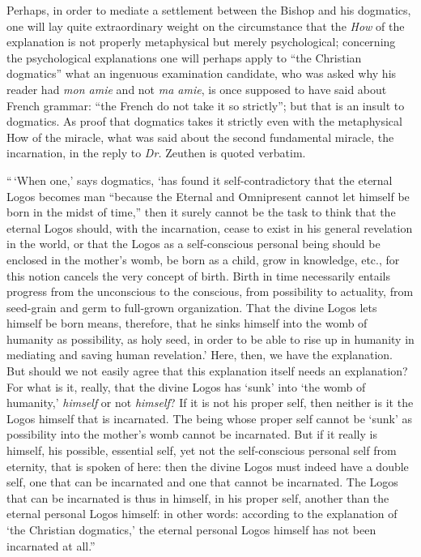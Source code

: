 \documentclass[12pt]{book}
\newcommand{\opage}[1]{\marginnote{\footnotesize\textit{[#1]}}}
\begin{document}
Perhaps, in order to mediate a settlement between the Bishop and his dogmatics, one will lay quite extraordinary weight on the circumstance that the \emph{How} of the explanation is not properly metaphysical but merely psychological; concerning the psychological explanations one will perhaps apply to ``the Christian dogmatics'' what an ingenuous examination candidate, who was asked why his reader had \textit{mon amie} and not \textit{ma amie}, is once supposed to have said about French grammar: ``the French do not take it so strictly''; but that is an insult to dogmatics. As proof that dogmatics takes it strictly even with the metaphysical How of the miracle, what was said about the second fundamental miracle, the incarnation, in the reply to \textit{Dr.} Zeuthen is quoted verbatim.

``\,`When one,' says dogmatics, `has found it self-contradictory that the eternal Logos becomes man ``because the Eternal and Omnipresent cannot let himself be born in the midst of time,'' then it surely cannot be the task to think that the eternal Logos should, with the incarnation, cease to exist in his general revelation in the world, or that the Logos as a self-conscious personal
\opage{88}\setcounter{footnote}{0}%
being should be enclosed in the mother's womb, be born as a child, grow in knowledge, etc., for this notion cancels the very concept of birth. Birth in time necessarily entails progress from the unconscious to the conscious, from possibility to actuality, from seed-grain and germ to full-grown organization. That the divine Logos lets himself be born means, therefore, that he sinks himself into the womb of humanity as possibility, as holy seed, in order to be able to rise up in humanity in mediating and saving human revelation.' Here, then, we have the explanation. But should we not easily agree that this explanation itself needs an explanation? For what is it, really, that the divine Logos has `sunk' into `the womb of humanity,' \emph{himself} or not \emph{himself}? If it is not his proper self, then neither is it the Logos himself that is incarnated. The being whose proper self cannot be `sunk' as possibility into the mother's womb cannot be incarnated. But if it really is himself, his possible, essential self, yet not the self-conscious personal self from eternity, that is spoken of here: then the divine Logos must indeed have a double self, one that can be incarnated and one that cannot be incarnated. The Logos that can be incarnated is thus in himself, in his proper self, another than the eternal personal Logos himself: in other words: according to the explanation of `the Christian dogmatics,' the eternal personal Logos himself has not been incarnated at all.''
\end{document}
